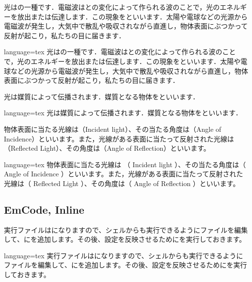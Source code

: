\documentclass[../main]{subfiles}
\begin{document}
光はの一種です．電磁波はとの変化によって作られる波のことで，光のエネルギーを放出または伝達します．この現象をといいます．太陽や電球などの光源から電磁波が発生し，大気中で散乱や吸収されながら直進し，物体表面にぶつかって反射が起こり，私たちの目に届きます．

\begin{Code}{language=tex}
光はの一種です．電磁波はとの変化によって作られる波のことで，光のエネルギーを放出または伝達します．この現象をといいます．太陽や電球などの光源から電磁波が発生し，大気中で散乱や吸収されながら直進し，物体表面にぶつかって反射が起こり，私たちの目に届きます．
\end{Code}

\HRuleLeader

光は媒質によって伝播されます．媒質となる物体をといいます．

\begin{Code}{language=tex}
光は媒質によって伝播されます．媒質となる物体をといいます．
\end{Code}

\HRuleLeader

物体表面に当たる光線は（Incident light）、その当たる角度は（Angle of Incidence）といいます。また，光線がある表面に当たって反射された光線は（Reflected Light）、その角度は（Angle of Reflection）といいます。

\begin{Code}{language=tex}
物体表面に当たる光線は （ Incident light ）、その当たる角度は（ Angle of Incidence ）といいます。また，光線がある表面に当たって反射された光線は（ Reflected Light ）、その角度は（ Angle of Reflection ）といいます。
\end{Code}

\subsection{EmCode, Inline}

実行ファイルはになりますので、シェルからも実行できるようにファイルを編集して、にを追加します。その後、設定を反映させるためにを実行しておきます。

\begin{Code}{language=tex}
実行ファイルはになりますので、シェルからも実行できるようにファイルを編集して、にを追加します。その後、設定を反映させるためにを実行しておきます。
\end{Code}
\end{document}
